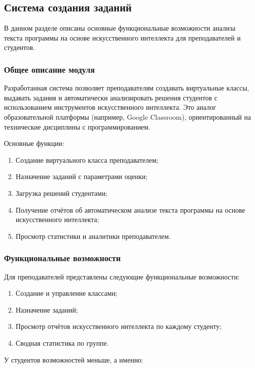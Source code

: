 \subsection{Система создания заданий}

В данном разделе описаны основные функциональные возможности анализа текста программы на основе искусственного интеллекта для преподавателей и студентов.

\subsubsection{Общее описание модуля}
Разработанная система позволяет преподавателям создавать виртуальные классы, выдавать задания и автоматически анализировать решения студентов с использованием инструментов искусственного интеллекта. Это аналог образовательной платформы (например, Google Classroom), ориентированный на технические дисциплины с программированием.

Основные функции:
\begin{enumerate}
  \item Создание виртуального класса преподавателем;
  \item Назначение заданий с параметрами оценки;
  \item Загрузка решений студентами;
  \item Получение отчётов об автоматическом анализе текста программы на основе искусственного интеллекта;
  \item Просмотр статистики и аналитики преподавателем.
\end{enumerate}

\subsubsection{Функциональные возможности}

Для преподавателей представлены следующие функциональные возможности: 

\begin{enumerate}
  \item Создание и управление классами;
  \item Назначение заданий;
  \item Просмотр отчётов искусственного интеллекта по каждому студенту;
  \item Сводная статистика по группе.
\end{enumerate}

У студентов возможностей меньше, а именно:

